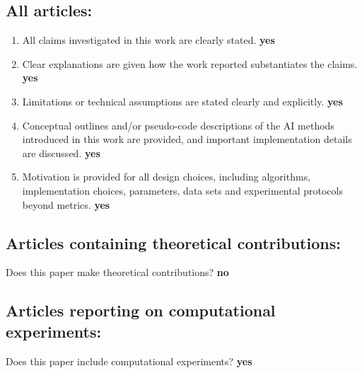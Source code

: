 \documentclass[manuscript, screen, review]{jair}
\theoremstyle{remark}
\begin{document}
\subsection*{All articles:}
\begin{enumerate}
    \item All claims investigated in this work are clearly stated. \textbf{yes}
    \item Clear explanations are given how the work reported substantiates the
    claims. \textbf{yes}
    \item Limitations or technical assumptions are stated clearly and
    explicitly. \textbf{yes}
    \item Conceptual outlines and/or pseudo-code descriptions of the AI methods
    introduced in this work are provided, and important implementation details
    are discussed. \textbf{yes}
    \item Motivation is provided for all design choices, including algorithms,
    implementation choices, parameters, data sets and experimental protocols
    beyond metrics. \textbf{yes}
\end{enumerate}

\subsection*{Articles containing theoretical contributions:}
Does this paper make theoretical contributions? \textbf{no}

\subsection*{Articles reporting on computational experiments:}
Does this paper include computational experiments? \textbf{yes}
\end{document}
